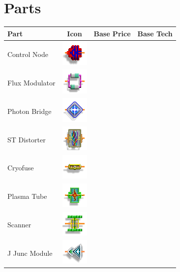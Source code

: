 \section{Parts}

\begin{tabular}{| l | c | l | l |}
\hline
Part & Icon & Base Price & Base Tech \\
\hline
Control Node & \includegraphics[scale=0.70]{images/part-controlnode.png} & & \\
Flux Modulator & \includegraphics[scale=0.70]{images/part-fluxmodulator.png} & &\\
Photon Bridge & \includegraphics[scale=0.70]{images/part-photonbridge.png} & &\\
ST Distorter & \includegraphics[scale=0.70]{images/part-stdistorter.png} & &\\
Cryofuse & \includegraphics[scale=0.70]{images/part-cryofuse.png} & &\\
Plasma Tube & \includegraphics[scale=0.70]{images/part-plasmatube.png} & &\\
Scanner & \includegraphics[scale=0.70]{images/part-scanner.png} & &\\
J Junc Module & \includegraphics[scale=0.70]{images/part-jjunc.png} & &\\
\hline
\end{tabular}

